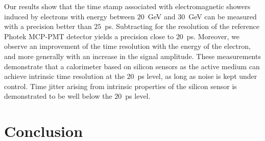 \documentclass[12pt]{article}
\begin{document}
{%

Our results show that the time stamp associated with electromagnetic 
showers induced by electrons with energy between $20$~GeV and $30$~GeV 
can be measured with a precision better than $25$~ps. Subtracting for the resolution
of the reference Photek MCP-PMT detector yields a precision close to $20$~ps. 
Moreover, we observe an improvement of the time resolution with the energy of 
the electron, and more generally with an increase in the signal amplitude. 
These measurements demonstrate that a calorimeter based on silicon sensors as
the active medium can achieve intrinsic time resolution at the $20$~ps level, as long
as noise is kept under control. Time jitter arising from intrinsic properties of the
silicon sensor is demonstrated to be well below the $20$~ps level.

\section{Conclusion}
\label{sec:conclusion} 

}
\end{document}
